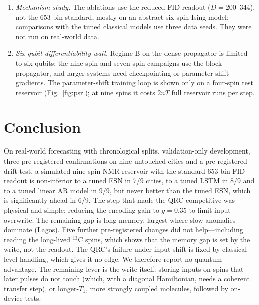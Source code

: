 \documentclass[aps,prresearch,preprint,superscriptaddress,amsmath,amssymb,floatfix]{revtex4-2}
\begin{document}
\begin{enumerate}
worse. Level handling fixes most of it (Sec.~\ref{sec:drift}), but it is a classical
addition to the readout, and only one of the two drift-test series is strongly shifted.
\item \emph{Mechanism study.} The ablations use the reduced-FID readout ($D=200$--$344$),
not the 653-bin standard, mostly on an abstract six-spin Ising model; comparisons with
the tuned classical models use three data seeds. They were not run on real-world data.
\item \emph{Six-qubit differentiability wall.} Regime B on the dense propagator is
limited to six qubits; the nine-spin and seven-spin campaigns use the block
propagator, and larger systems need checkpointing or parameter-shift gradients. The
parameter-shift training loop is shown only on a four-spin test reservoir
(Fig.~\ref{fig:psr}); at nine spins it costs $2nT$ full reservoir runs per step.
\end{enumerate}

\section{Conclusion}\label{sec:conclusion}
On real-world forecasting with chronological splits, validation-only development,
three pre-registered confirmations on nine untouched cities and a pre-registered drift
test, a simulated nine-spin NMR reservoir with the standard 653-bin FID readout is
non-inferior to a tuned ESN in 7/9 cities, to a tuned LSTM in 8/9 and to a tuned linear
AR model in 9/9, but never better than the tuned ESN, which is significantly ahead in
6/9. The step that made the QRC competitive was physical and simple: reducing the
encoding gain to $g=0.35$ to limit input overwrite. The remaining gap is long memory,
largest where slow anomalies dominate (Lagos). Five further pre-registered changes did
not help---including reading the long-lived $^{13}$C spins, which shows that the memory
gap is set by the write, not the readout. The QRC's failure under input shift is fixed
by classical level handling, which gives it no edge. We therefore report no quantum
advantage. The remaining lever is the write itself: storing inputs on spins that later
pulses do not touch (which, with a diagonal Hamiltonian, needs a coherent transfer
step), or longer-$T_1$, more strongly coupled molecules, followed by on-device tests.
\end{document}
